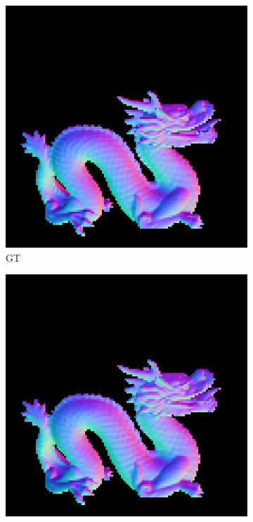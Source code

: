 \begin{figure}[H]
\begin{subfigure}[b]{0.24\linewidth}
		\includegraphics[width=\linewidth]{./Figures/gcnn_synthetic/fancy_eval_7_groundtruth.png}
		\caption{GT}
	\end{subfigure}
	\begin{subfigure}[b]{0.24\linewidth}
		\includegraphics[width=\linewidth]{./Figures/gcnn_synthetic/fancy_eval_7_normal_an2-8-1000.png}

\end{subfigure}
\end{figure}
